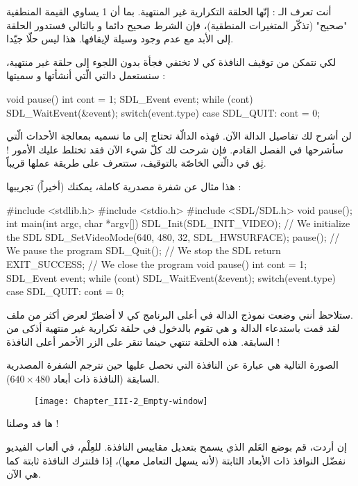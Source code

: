 أنت تعرف الـ :
إنّها الحلقة التكرارية غير المنتهية. بما أن 1 يساوي القيمة المنطقية "صحيح" (تذكّر المتغيرات المنطقية)، فإن الشرط صحيح دائما و بالتالي فستدور الحلقة إلى الأبد مع عدم وجود وسيلة لإيقافها. هذا ليس حلّا جيّدا.

لكي نتمكن من توقيف النافذة كي لا تختفي فجأة بدون اللجوء إلى حلقة غير منتهية، سنستعمل دالتي الّتي أنشأتها و سميتها
 :

\begin{Csource}
void pause()
{
	int cont = 1;
	SDL_Event event;
	while (cont)
	{
		SDL_WaitEvent(&event);
		switch(event.type)
		{
			case SDL_QUIT:
			cont = 0;
		}
	}
}
\end{Csource}

لن أشرح لك تفاصيل الدالة الآن. فهذه الدالّة تحتاج إلى ما نسميه بمعالجة الأحداث الّتي سأشرحها في الفصل القادم. فإن شرحت لك كلّ شيء الآن فقد تختلط عليك الأمور ! ثِق في دالّتي الخاصّة بالتوقيف، ستتعرف على طريقة عملها قريباً.

هذا مثال عن شفرة مصدرية كاملة، يمكنك (أخيراً) تجريبها :

\begin{Csource}
#include <stdlib.h>
#include <stdio.h>
#include <SDL/SDL.h>
void pause();
int main(int argc, char *argv[])
{
	SDL_Init(SDL_INIT_VIDEO); // We initialize the SDL
	SDL_SetVideoMode(640, 480, 32, SDL_HWSURFACE);
	pause(); // We pause the program
	SDL_Quit(); // We stop the SDL
	return EXIT_SUCCESS; // We close the program
}
void pause()
{
	int cont = 1;
	SDL_Event event;
	while (cont)
	{
		SDL_WaitEvent(&event);
		switch(event.type)
		{
			case SDL_QUIT:
			cont = 0;
		}
	}
}
\end{Csource}

ستلاحظ أنني وضعت نموذج الدالة
في أعلى البرنامج كي لا أضطرّ لعرض أكثر من ملف.\\
لقد قمت باستدعاء الدالة 
و هي تقوم بالدخول في حلقة تكرارية غير منتهية أذكى من السابقة. هذه الحلقة تنتهي حينما تنقر على الزر الأحمر 
أعلى النافذة !

الصورة التالية هي عبارة عن النافذة التي نحصل عليها حين نترجم الشفرة المصدرية السابقة (النافذة ذات أبعاد
$640 \times 480$).

\begin{figure}[H]
	\centering
	\texttt{[image: Chapter\_III-2\_Empty-window]}
\end{figure}

ها قد وصلنا !

إن أردت، قم بوضع العَلم الذي يسمح بتعديل مقاييس النافذة. للعِلْم، في ألعاب الفيديو نفضّل النوافذ ذات الأبعاد الثابتة (لأنه يسهل التعامل معها)، إذا فلنترك النافذة ثابتة كما هي الآن.

